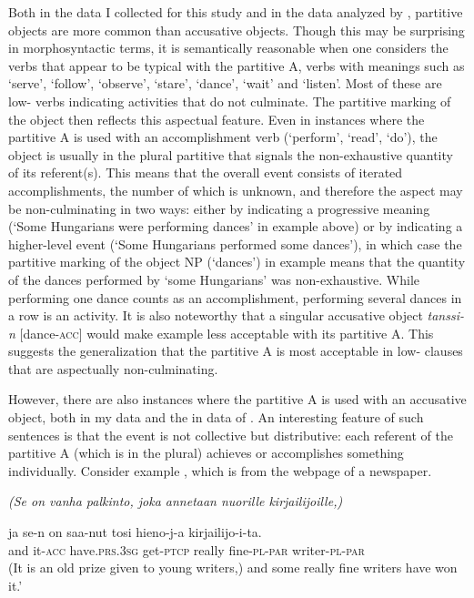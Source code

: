 \documentclass[output=paper]{LSP/langsci}
\begin{document}
Both in the data I collected for this study and in the data analyzed by \citet{Yli-Vakkuri1979Partitiivisubjektin}, partitive objects are more common than accusative objects. Though this may be surprising in morphosyntactic terms, it is semantically reasonable when one considers the verbs that appear to be typical with the partitive A, \ie  verbs with meanings such as ‘serve’, ‘follow’, ‘observe’, ‘stare’, ‘dance’, ‘wait’ and ‘listen’. Most of these are low- verbs indicating activities that do not culminate. The partitive marking of the object then reflects this aspectual feature. Even in instances where the partitive A is used with an accomplishment verb (\eg ‘perform’, ‘read’, ‘do’), the object is usually in the plural partitive that signals the non-exhaustive quantity of its referent(s). This means that the overall event consists of iterated accomplishments, the number of which is unknown, and therefore the aspect may be non-culminating in two ways: either by indicating a progressive meaning (‘Some Hungarians were performing dances’ in example  above) or by indicating a higher-level  event (‘Some Hungarians performed some dances’), in which case the partitive marking of the object NP (‘dances’) in example  means that the quantity of the dances performed by ‘some Hungarians’ was non-exhaustive. While performing one dance counts as an accomplishment, performing several dances in a row is an activity. It is also noteworthy that a singular accusative object \textit{tanssi-n} [dance-\textsc{acc}] would make example  less acceptable with its partitive A. This suggests the generalization that the partitive A is most acceptable in low- clauses that are aspectually non-culminating.

However, there are also instances where the partitive A is used with an accusative object, both in my data and the in data of \citet{Yli-Vakkuri1979Partitiivisubjektin}. An interesting feature of such sentences is that the event is not collective but distributive: each referent of the partitive A (which is in the plural) achieves or accomplishes something individually. Consider example , which is from the webpage of a newspaper. 

\ea\label{15-hu-ex:23}

\emph{(Se on vanha palkinto, joka annetaan nuorille kirjailijoille,)}

\gll ja se-n on saa-nut tosi hieno-j-a kirjailijo-i-ta.\\
and it-\textsc{acc} have.\textsc{prs}.\textsc{3sg} get-\textsc{ptcp} really fine-\textsc{pl}-\textsc{par} writer-\textsc{pl}-\textsc{par}\\
\glt (It is an old prize given to young writers,) and some really fine writers have won it.’ %
\z
\end{document}
